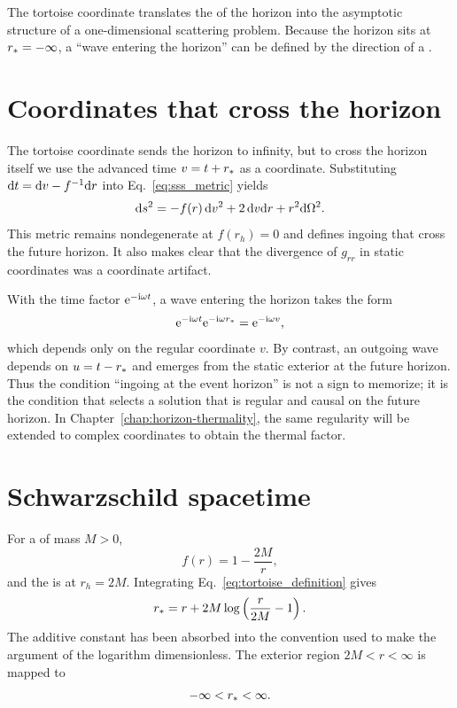 \begin{principlebox}
The tortoise coordinate translates the  of the horizon into the asymptotic structure of a one-dimensional scattering problem. Because the horizon sits at $r_*=-\infty$, a ``wave entering the horizon'' can be defined by the direction of a .
\end{principlebox}

\section{Coordinates that cross the horizon}

The tortoise coordinate sends the horizon to infinity, but to cross the horizon itself we use the advanced time $v=t+r_*$ as a coordinate. Substituting $\mathrm{d} t=\mathrm{d} v-f^{-1}\mathrm{d} r$ into Eq.~\eqref{eq:sss_metric} yields
\begin{equation}
\mathrm{d} s^2
=
-f(r)\,\mathrm{d} v^2
+2\,\mathrm{d} v\mathrm{d} r
+r^2\mathrm{d}\Omega^2.
\label{eq:ingoing-ef-metric}
\end{equation}
This metric remains nondegenerate at $f(r_h)=0$ and defines ingoing  that cross the future horizon. It also makes clear that the divergence of $g_{rr}$ in static coordinates was a coordinate artifact.

With the time factor $\mathrm{e}^{-\mathrm{i}\omega t}$, a wave entering the horizon takes the form
\begin{equation}
\mathrm{e}^{-\mathrm{i}\omega t}\mathrm{e}^{-\mathrm{i}\omega r_*}
=
\mathrm{e}^{-\mathrm{i}\omega v},
\label{eq:ingoing-ef-regular-mode}
\end{equation}
which depends only on the regular coordinate $v$. By contrast, an outgoing wave depends on $u=t-r_*$ and emerges from the static exterior at the future horizon. Thus the condition ``ingoing at the event horizon'' is not a sign to memorize; it is the condition that selects a solution that is regular and causal on the future horizon. In Chapter~\ref{chap:horizon-thermality}, the same regularity will be extended to complex coordinates to obtain the thermal factor.

\section{Schwarzschild spacetime}

For a  of mass $M>0$,
\begin{equation}
f(r)
=
1-\frac{2M}{r},
\label{eq:schwarzschild_f}
\end{equation}
and the  is at $r_h=2M$. Integrating Eq.~\eqref{eq:tortoise_definition} gives
\begin{equation}
r_*
=
r
+2M\log\left(\frac{r}{2M}-1\right).
\label{eq:schwarzschild_tortoise}
\end{equation}
The additive constant has been absorbed into the convention used to make the argument of the logarithm dimensionless. The exterior region $2M<r<\infty$ is mapped to
\begin{equation}
-\infty<r_*<\infty.
\end{equation}

